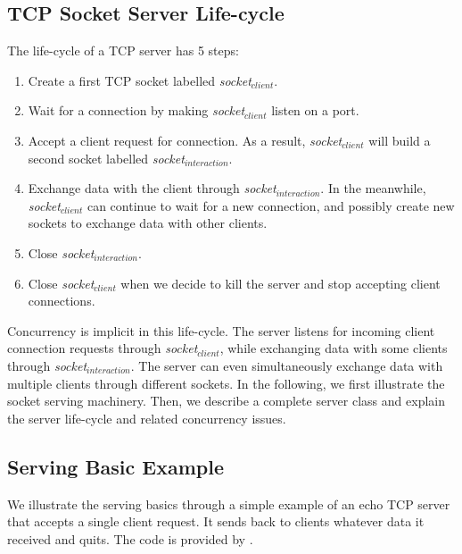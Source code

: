 \documentclass[a4paper,10pt,twoside]{book}
\begin{document}
\subsection{TCP Socket Server Life-cycle}
The life-cycle of a TCP server has 5 steps:
\begin{enumerate}
\item Create a first TCP socket labelled \textit{socket$_{client}$}.
\item Wait for a connection by making \textit{socket$_{client}$}  listen on a port.
\item Accept a client request for connection. As a result, \textit{socket$_{client}$} will build a second socket labelled \textit{socket$_{interaction}$}.
\item Exchange data with the client through \textit{socket$_{interaction}$}. In the meanwhile, \textit{socket$_{client}$} can continue to wait for a new connection, and possibly create new sockets to exchange data with other clients. 
\item Close \textit{socket$_{interaction}$}.
\item Close \textit{socket$_{client}$} when we decide to kill the server and stop accepting client connections.
\end{enumerate}

Concurrency is implicit in this life-cycle.
The server listens for incoming client connection requests through \textit{socket$_{client}$}, while exchanging data with some clients through \textit{socket$_{interaction}$}.
The server can even simultaneously exchange data with multiple clients through different sockets.
In the following, we first illustrate the socket serving machinery.
Then, we describe a complete server class and explain the server life-cycle and related concurrency issues.

\subsection{Serving Basic Example}
We illustrate the serving basics through a simple example of an echo TCP server that accepts a single client request.
It sends back to clients whatever data it received and quits.
The code is provided by .
\end{document}
